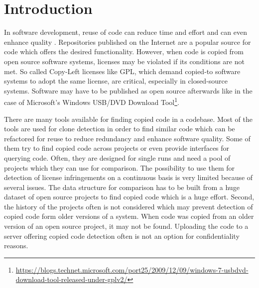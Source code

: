 
\chapter{Introduction}\label{chapter:introduction}
In software development, reuse of code can reduce time and effort and can even enhance quality \cite{krueger1992software}.
Repositories published on the Internet are a popular source for code which offers the desired functionality.
However, when code is copied from open source software systems, licenses may be violated if its conditions are not met.
So called Copy-Left licenses like GPL, which demand copied-to software systems to adopt the same license, are critical, especially in closed-source systems.
Software may have to be published as open source afterwards like in the case of Microsoft's \glqq Windows USB/DVD Download Tool\grqq\footnote{\href{https://blogs.technet.microsoft.com/port25/2009/12/09/windows-7-usbdvd-download-tool-released-under-gplv2/}{https://blogs.technet.microsoft.com/port25/2009/12/09/windows-7-usbdvd-download-tool-released-under-gplv2/}}.

There are many tools available for finding copied code in a codebase.
Most of the tools are used for clone detection in order to find similar code which can be refactored for reuse to reduce redundancy and enhance software quality.
Some of them try to find copied code across projects or even provide interfaces for querying code.
Often, they are designed for single runs and need a pool of projects which they can use for comparison.
The possibility to use them for detection of license infringements on a continuous basis is very limited because of several issues.
The data structure for comparison has to be built from a huge dataset of open source projects to find copied code which is a huge effort.
Second, the history of the projects often is not considered which may prevent detection of copied code form older versions of a system.
When code was copied from an older version of an open source project, it may not be found.
Uploading the code to a server offering copied code detection often is not an option for confidentiality reasons.

